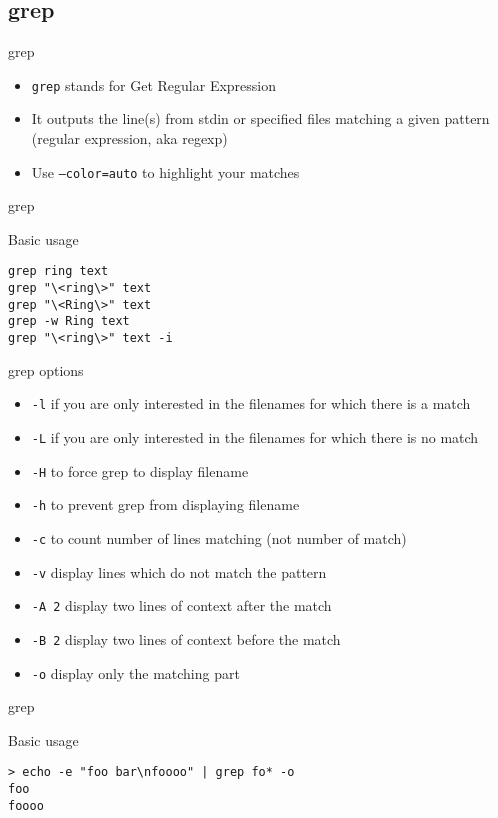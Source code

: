 \subsection{grep}
\begin{frame}[fragile]{grep}
\begin{itemize}
  \item \texttt{grep} stands for Get Regular Expression
  \pause
  \item It outputs the line(s) from stdin or specified files matching a given pattern (regular expression, aka regexp)
  \pause
  \item Use \texttt{--color=auto} to highlight your matches
\end{itemize}
\end{frame}

\begin{frame}[fragile]{grep}
  \begin{exampleblock}{Basic usage}
    \begin{lstlisting}[showstringspaces=false]
grep ring text
grep "\<ring\>" text
grep "\<Ring\>" text
grep -w Ring text
grep "\<ring\>" text -i
    \end{lstlisting}
  \end{exampleblock}
\end{frame}

\begin{frame}[fragile]{grep options}
  \begin{itemize}
    \item \texttt{-l} if you are only interested in the filenames for which there is a match
    \pause \item \texttt{-L} if you are only interested in the filenames for which there is no match
    \pause \item \texttt{-H} to force grep to display filename
    \pause \item \texttt{-h} to prevent grep from displaying filename
    \pause \item \texttt{-c} to count number of lines matching (not number of match)
    \pause \item \texttt{-v} display lines which do not match the pattern
    \pause \item \texttt{-A 2} display two lines of context after the match
    \pause \item \texttt{-B 2} display two lines of context before the match
    \pause \item \texttt{-o} display only the matching part 
  \end{itemize}
\end{frame}
\begin{frame}[fragile]{grep}
  \begin{exampleblock}{Basic usage}
    \begin{lstlisting}[showstringspaces=false]
> echo -e "foo bar\nfoooo" | grep fo* -o
foo
foooo
    \end{lstlisting}
  \end{exampleblock}
\end{frame}

